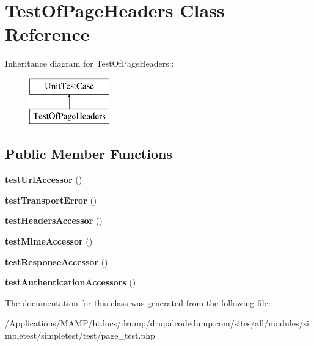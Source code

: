 \hypertarget{class_test_of_page_headers}{
\section{TestOfPageHeaders Class Reference}
\label{class_test_of_page_headers}
}
Inheritance diagram for TestOfPageHeaders::\begin{figure}[H]
\begin{center}
\leavevmode
\includegraphics[height=2cm]{class_test_of_page_headers}
\end{center}
\end{figure}
\subsection*{Public Member Functions}
\begin{DoxyCompactItemize}
\item 
\hypertarget{class_test_of_page_headers_a9a5c5ccb4141f5ca532ed50d09730bda}{
{\bfseries testUrlAccessor} ()}
\label{class_test_of_page_headers_a9a5c5ccb4141f5ca532ed50d09730bda}

\item 
\hypertarget{class_test_of_page_headers_a3c67f91dd3ae9b031359f8f4ceecffc7}{
{\bfseries testTransportError} ()}
\label{class_test_of_page_headers_a3c67f91dd3ae9b031359f8f4ceecffc7}

\item 
\hypertarget{class_test_of_page_headers_ad792a24b01ec22c92cff1b2689c39719}{
{\bfseries testHeadersAccessor} ()}
\label{class_test_of_page_headers_ad792a24b01ec22c92cff1b2689c39719}

\item 
\hypertarget{class_test_of_page_headers_a2410badc12151e7b0499451f0c4ab4e1}{
{\bfseries testMimeAccessor} ()}
\label{class_test_of_page_headers_a2410badc12151e7b0499451f0c4ab4e1}

\item 
\hypertarget{class_test_of_page_headers_abc2fb975b370c2452a7ac51bd04f72de}{
{\bfseries testResponseAccessor} ()}
\label{class_test_of_page_headers_abc2fb975b370c2452a7ac51bd04f72de}

\item 
\hypertarget{class_test_of_page_headers_a752206300a777bc331966216d396ab33}{
{\bfseries testAuthenticationAccessors} ()}
\label{class_test_of_page_headers_a752206300a777bc331966216d396ab33}

\end{DoxyCompactItemize}


The documentation for this class was generated from the following file:\begin{DoxyCompactItemize}
\item 
/Applications/MAMP/htdocs/drump/drupalcodedump.com/sites/all/modules/simpletest/simpletest/test/page\_\-test.php\end{DoxyCompactItemize}
